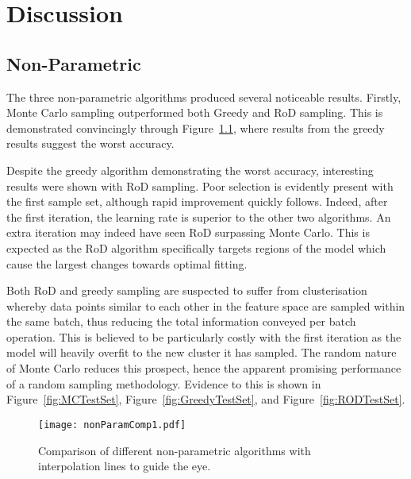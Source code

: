\chapter{Discussion}


\graphicspath{{Chapter5/Figs/Vector/}{Chapter5/Figs/}}


\section{Non-Parametric}
The three non-parametric algorithms produced several noticeable results. Firstly, Monte Carlo sampling outperformed both Greedy and RoD sampling. This is demonstrated convincingly through Figure~\ref{fig:nPComp}, where results from the greedy results suggest the worst accuracy.

Despite the greedy algorithm demonstrating the worst accuracy, interesting results were shown with RoD sampling. Poor selection is evidently present with the first sample set, although rapid improvement quickly follows. Indeed, after the first iteration, the learning rate is superior to the other two algorithms. An extra iteration may indeed have seen RoD surpassing Monte Carlo. This is expected as the RoD algorithm specifically targets regions of the model which cause the largest changes towards optimal fitting.

Both RoD and greedy sampling are suspected to suffer from clusterisation whereby data points similar to each other in the feature space are sampled within the same batch, thus reducing the total information conveyed per batch operation. This is believed to be particularly costly with the first iteration as the model will heavily overfit to the new cluster it has sampled. The random nature of Monte Carlo reduces this prospect, hence the apparent promising performance of a random sampling methodology. Evidence to this is shown in Figure~\ref{fig:MCTestSet}, Figure~\ref{fig:GreedyTestSet}, and Figure~\ref{fig:RODTestSet}.

\begin{figure}[h]
    \begin{center}
        \texttt{[image: nonParamComp1.pdf]}
        \caption[Non-Parametric Comparison]{Comparison of different non-parametric algorithms with interpolation lines to guide the eye.}
        \label{fig:nPComp}
    \end{center}
\end{figure}

